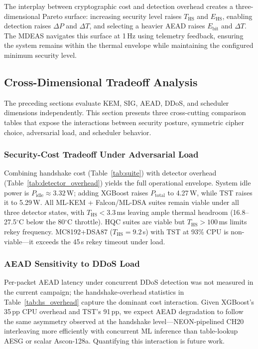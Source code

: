 The interplay between cryptographic cost and detection overhead
creates a three-dimensional Pareto surface: increasing security level
raises $T_\text{HS}$ and $E_\text{HS}$, enabling detection raises
$\Delta P$ and $\Delta T$, and selecting a heavier AEAD raises
$E_\text{bit}$ and $\Delta T$.  The MDEAS navigates this surface at
1\,Hz using telemetry feedback, ensuring the system remains within
the thermal envelope while maintaining the configured minimum security
level.

\subsection{Cross-Dimensional Tradeoff Analysis}
\label{sec:tradeoff}

The preceding sections evaluate KEM, SIG, AEAD, DDoS, and scheduler
dimensions independently.  This section presents three cross-cutting
comparison tables that expose the interactions between security posture,
symmetric cipher choice, adversarial load, and scheduler behavior.

\subsubsection{Security-Cost Tradeoff Under Adversarial Load}

Combining handshake cost (Table~\ref{tab:suite}) with detector
overhead (Table~\ref{tab:detector_overhead}) yields the
full operational envelope.  System idle power is
$P_\text{idle} \approx 3.32$\,W; adding XGBoost raises
$P_\text{total}$ to 4.27\,W, while TST raises it to 5.29\,W.  All
ML-KEM + Falcon/ML-DSA suites remain viable under all three detector
states, with $T_\text{HS} < 3.3$\,ms leaving ample thermal headroom
(16.8--27.5$^\circ$C below the 80$^\circ$C throttle).  HQC suites are
viable but $T_\text{HS} > 100$\,ms limits rekey frequency.
MC8192+DSA87 ($T_\text{HS} = 9.2$\,s) with TST at 93\% CPU is
non-viable—it exceeds the 45\,s rekey timeout under load.

\subsubsection{AEAD Sensitivity to DDoS Load}

Per-packet AEAD latency under concurrent DDoS detection was not
measured in the current campaign; the handshake-overhead statistics
in Table~\ref{tab:hs_overhead} capture the dominant cost interaction.
Given XGBoost's 35\,pp CPU overhead and TST's 91\,pp, we expect AEAD
degradation to follow the same asymmetry observed at the handshake
level—NEON-pipelined CH20 interleaving more efficiently with concurrent
ML inference than table-lookup AESG or scalar Ascon-128a.  Quantifying
this interaction is future work.

